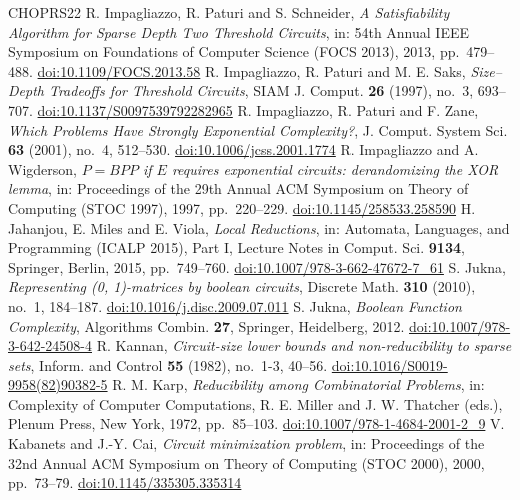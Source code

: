 \documentclass[11pt,reqno]{amsart}
\numberwithin{equation}{section}
\theoremstyle{plain}
\theoremstyle{definition}
\theoremstyle{remark}
\begin{document}
\begin{thebibliography}{CHOPRS22}
 R. Impagliazzo, R. Paturi and S. Schneider, \emph{A Satisfiability Algorithm for Sparse Depth Two Threshold Circuits}, in: 54th Annual IEEE Symposium on Foundations of Computer Science (FOCS 2013), 2013, pp.~479--488. \href{https://doi.org/10.1109/FOCS.2013.58}{doi:10.1109/FOCS.2013.58}
 R. Impagliazzo, R. Paturi and M. E. Saks, \emph{Size--Depth Tradeoffs for Threshold Circuits}, SIAM J. Comput. \textbf{26} (1997), no.~3, 693--707. \href{https://doi.org/10.1137/S0097539792282965}{doi:10.1137/S0097539792282965}
 R. Impagliazzo, R. Paturi and F. Zane, \emph{Which Problems Have Strongly Exponential Complexity?}, J. Comput. System Sci. \textbf{63} (2001), no.~4, 512--530. \href{https://doi.org/10.1006/jcss.2001.1774}{doi:10.1006/jcss.2001.1774}
 R. Impagliazzo and A. Wigderson, \emph{$P=BPP$ if $E$ requires exponential circuits: derandomizing the XOR lemma}, in: Proceedings of the 29th Annual ACM Symposium on Theory of Computing (STOC 1997), 1997, pp.~220--229. \href{https://doi.org/10.1145/258533.258590}{doi:10.1145/258533.258590}
 H. Jahanjou, E. Miles and E. Viola, \emph{Local Reductions}, in: Automata, Languages, and Programming (ICALP 2015), Part I, Lecture Notes in Comput. Sci. \textbf{9134}, Springer, Berlin, 2015, pp.~749--760. \href{https://doi.org/10.1007/978-3-662-47672-7_61}{doi:10.1007/978-3-662-47672-7\_61}
 S. Jukna, \emph{Representing (0, 1)-matrices by boolean circuits}, Discrete Math. \textbf{310} (2010), no.~1, 184--187. \href{https://doi.org/10.1016/j.disc.2009.07.011}{doi:10.1016/j.disc.2009.07.011}
 S. Jukna, \emph{Boolean Function Complexity}, Algorithms Combin. \textbf{27}, Springer, Heidelberg, 2012. \href{https://doi.org/10.1007/978-3-642-24508-4}{doi:10.1007/978-3-642-24508-4}
 R. Kannan, \emph{Circuit-size lower bounds and non-reducibility to sparse sets}, Inform. and Control \textbf{55} (1982), no.~1-3, 40--56. \href{https://doi.org/10.1016/S0019-9958(82)90382-5}{doi:10.1016/S0019-9958(82)90382-5}
 R. M. Karp, \emph{Reducibility among Combinatorial Problems}, in: Complexity of Computer Computations, R. E. Miller and J. W. Thatcher (eds.), Plenum Press, New York, 1972, pp.~85--103. \href{https://doi.org/10.1007/978-1-4684-2001-2_9}{doi:10.1007/978-1-4684-2001-2\_9}
 V. Kabanets and J.-Y. Cai, \emph{Circuit minimization problem}, in: Proceedings of the 32nd Annual ACM Symposium on Theory of Computing (STOC 2000), 2000, pp.~73--79. \href{https://doi.org/10.1145/335305.335314}{doi:10.1145/335305.335314}

\end{thebibliography}
\end{document}
